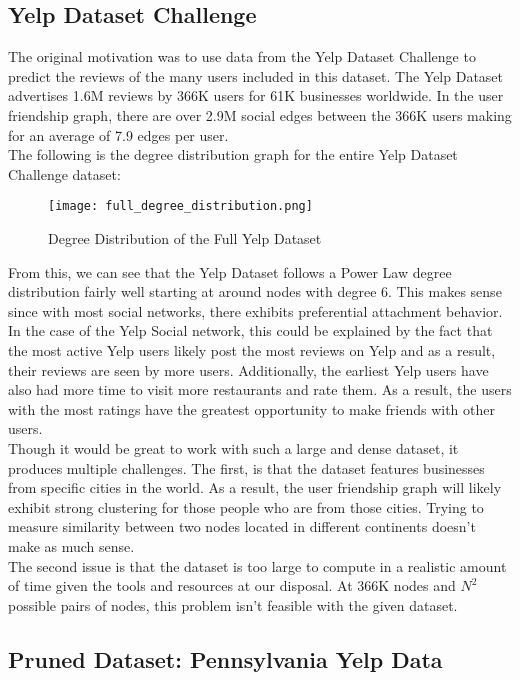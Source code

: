\documentclass[10pt]{article}
\begin{document}
\subsection{Yelp Dataset Challenge}
The original motivation was to use data from the Yelp Dataset Challenge to predict the reviews of the many users included in this dataset. The Yelp Dataset advertises 1.6M reviews by 366K users for 61K businesses worldwide. In the user friendship graph, there are over 2.9M social edges between the 366K users making for an average of 7.9 edges per user. \\

The following is the degree distribution graph for the entire Yelp Dataset Challenge dataset:

\begin{figure}[h]
\centering
\texttt{[image: full\_degree\_distribution.png]}
\caption{Degree Distribution of the Full Yelp Dataset}
\end{figure}

From this, we can see that the Yelp Dataset follows a Power Law degree distribution fairly well starting at around nodes with degree 6. This makes sense since with most social networks, there exhibits preferential attachment behavior. In the case of the Yelp Social network, this could be explained by the fact that the most active Yelp users likely post the most reviews on Yelp and as a result, their reviews are seen by more users. Additionally, the earliest Yelp users have also had more time to visit more restaurants and rate them. As a result, the users with the most ratings have the greatest opportunity to make friends with other users. \\

Though it would be great to work with such a large and dense dataset, it produces multiple challenges. The first, is that the dataset features businesses from specific cities in the world. As a result, the user friendship graph will likely exhibit strong clustering for those people who are from those cities. Trying to measure similarity between two nodes located in different continents doesn't make as much sense. \\

The second issue is that the dataset is too large to compute in a realistic amount of time given the tools and resources at our disposal. At 366K nodes and $ N^2 $ possible pairs of nodes, this problem isn't feasible with the given dataset.

\subsection{Pruned Dataset: Pennsylvania Yelp Data}
\end{document}
